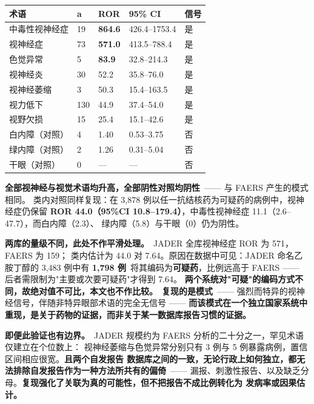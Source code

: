 \documentclass[UTF8,fontset=windows,11pt]{ctexart}
\begin{document}
\begin{center}
\small
\begin{longtable}{p{}p{}p{}p{}p{}}
\hline
术语 & a & ROR & 95\% CI & 信号 \\
\hline
中毒性视神经症 & 19 & \textbf{864.6} & 426.4–1753.4 & 是 \\
视神经症 & 73 & \textbf{571.0} & 413.5–788.4 & 是 \\
色觉异常 & 5 & \textbf{83.9} & 32.8–214.3 & 是 \\
视神经炎 & 30 & 52.2 & 35.8–76.0 & 是 \\
视神经萎缩 & 3 & 50.3 & 15.4–163.5 & 是 \\
视力低下 & 130 & 44.9 & 37.4–54.0 & 是 \\
视野欠损 & 15 & 25.4 & 15.1–42.6 & 是 \\
白内障（对照） & 4 & 1.40 & 0.53–3.75 & 否 \\
绿内障（对照） & 2 & 1.26 & 0.31–5.04 & 否 \\
干眼（对照） & 0 & — & — & 否 \\
\hline
\end{longtable}
\end{center}

\textbf{全部视神经与视觉术语均升高，全部阴性对照均阴性}\ —— 与 FAERS 产生的模式相同。 类内对照同样复现：在 3,878 例以任一抗结核药为可疑药的病例中，视神经症仍保留 \textbf{ROR 44.0（95\%CI 10.8–179.4）}，中毒性视神经症 11.1（2.6–47.7），而白内障（2.3）、 绿内障（5.8）与干眼（0）仍为阴性。

\textbf{两库的量级不同，此处不作平滑处理。}\ JADER 全库视神经症 ROR 为 571，FAERS 为 159； 类内估计为 44.0 对 7.64。原因在数据中可见：JADER 命名乙胺丁醇的 3,483 例中有 \textbf{1,798 例}\ 将其编码为\textbf{可疑药}，比例远高于 FAERS —— 后者需限制为"主要或次要可疑药"才得到 7.64。 \textbf{两个系统对"可疑"的编码方式不同，故绝对值不可比，本文也不作比较。}\ \textbf{复现的是模式}\ —— 强烈而特异的视神经信号，伴随非特异眼部术语的完全无信号 —— \textbf{而该模式在一个独立国家系统中重现，是关于药物的证据，而非关于某一数据库报告习惯的证据。}

\textbf{即便此验证也有边界。}\ JADER 规模约为 FAERS 分析的二十分之一，罕见术语仅建立在个位数上： 视神经萎缩与色觉异常分别只有 3 例与 5 例暴露病例，置信区间相应很宽。\textbf{且两个自发报告 数据库之间的一致，无论行政上如何独立，都无法排除自发报告作为一种方法所共有的偏倚}\ —— 漏报、刺激性报告、以及缺乏分母。\textbf{复现强化了关联为真的可能性，但不把报告不成比例转化为 发病率或因果估计。}
\end{document}
